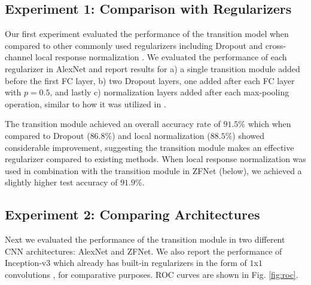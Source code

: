 \documentclass[runningheads,a4paper]{llncs}
\begin{document}

\subsection{Experiment 1: Comparison with Regularizers}
\label{sec:r_regularizers}

Our first experiment evaluated the performance of the transition model when compared to other commonly used regularizers including Dropout \cite{Srivastava2014} and cross-channel local response normalization \cite{Krizhevsky2012}. We evaluated the performance of each regularizer in AlexNet and report results for a) a single transition module added before the first FC layer, b) two Dropout layers, one added after each FC layer with $p=0.5$, and lastly c) normalization layers added after each max-pooling operation, similar to how it was utilized in \cite{Krizhevsky2012}. 

The transition module achieved an overall accuracy rate of $91.5\%$ which when compared to Dropout ($86.8\%$) and local normalization ($88.5\%$) showed considerable improvement, suggesting the transition module makes an effective regularizer compared to existing methods. When local response normalization was used in combination with the transition module in ZFNet (below), we achieved a slightly higher test accuracy of $91.9\%$.


\subsection{Experiment 2: Comparing Architectures}
\label{sec:r_architecture}

Next we evaluated the performance of the transition module in two different CNN architectures: AlexNet and ZFNet. We also report the performance of Inception-v3 which already has built-in regularizers in the form of $1$x$1$ convolutions \cite{Szegedy2016}, for comparative purposes. ROC curves are shown in Fig. \ref{fig:roc}.

\end{document}
